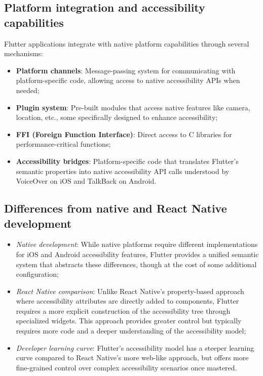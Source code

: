 \subsection{Platform integration and accessibility capabilities}
Flutter applications integrate with native platform capabilities through several mechanisms:
\begin{itemize}
    \item \textbf{Platform channels}: Message-passing system for communicating with platform-specific code, allowing access to native accessibility APIs when needed;
    \item \textbf{Plugin system}: Pre-built modules that access native features like camera, location, etc., some specifically designed to enhance accessibility;
    \item \textbf{FFI (Foreign Function Interface)}: Direct access to C libraries for performance-critical functions;
    \item \textbf{Accessibility bridges}: Platform-specific code that translates Flutter's semantic properties into native accessibility API calls understood by VoiceOver on iOS and TalkBack on Android.
\end{itemize}

\subsection{Differences from native and React Native development}
\begin{itemize}
    \item \textit{Native development}: While native platforms require different implementations for iOS and Android accessibility features, Flutter provides a unified semantic system that abstracts these differences, though at the cost of some additional configuration;
    
    \item \textit{React Native comparison}: Unlike React Native's property-based approach where accessibility attributes are directly added to components, Flutter requires a more explicit construction of the accessibility tree through specialized widgets. This approach provides greater control but typically requires more code and a deeper understanding of the accessibility model;
    
    \item \textit{Developer learning curve}: Flutter's accessibility model has a steeper learning curve compared to React Native's more web-like approach, but offers more fine-grained control over complex accessibility scenarios once mastered.
\end{itemize}

